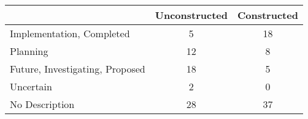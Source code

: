 \begin{tabular}{l*{1}{cc}}
 &Unconstructed &Constructed  \\
\hline 
Implementation, Completed &          5 &         18  \\
Planning &         12 &          8  \\
Future, Investigating, Proposed &         18 &          5  \\
Uncertain &          2 &          0  \\
No Description &         28 &         37  \\
\hline
\end{tabular}